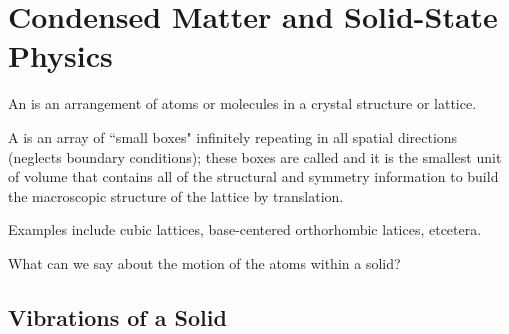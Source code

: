 \documentclass[12pt, a4paper, oneside, openright, titlepage]{book}
\begin{document}
\chapter{Condensed Matter and Solid-State Physics}

\begin{defn}
    An  is an arrangement of atoms or molecules in a crystal structure or lattice.
\end{defn}

\begin{defn}
    A  is an array of ``small boxes" infinitely repeating in all spatial directions (neglects boundary conditions); these boxes are called  and it is the smallest unit of volume that contains all of the structural and symmetry information to build the macroscopic structure of the lattice by translation.
\end{defn}

Examples include cubic lattices, base-centered orthorhombic latices, etcetera.

\begin{qst}
    What can we say about the motion of the atoms within a solid?
\end{qst}



\section{Vibrations of a Solid}
\end{document}

